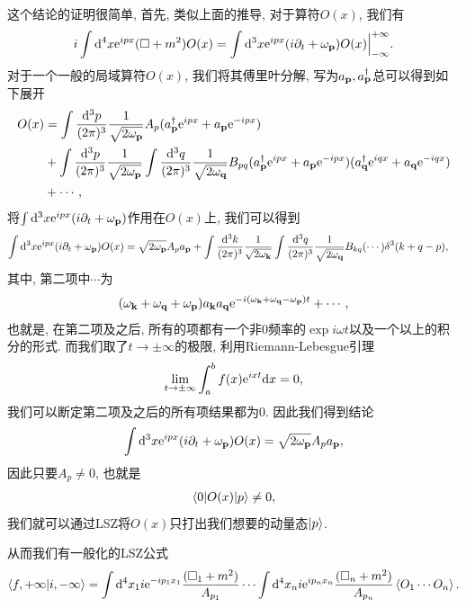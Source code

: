 这个结论的证明很简单, 首先, 类似上面的推导, 对于算符$O(x)$, 我们有
\begin{align}
    i\int\mathrm d^4x\mathrm e^{ipx}(\Box+m^2)O(x)=\int\mathrm d^3x\mathrm e^{ipx}(i\partial_t+\omega_{\mathbf{p}})O(x)\Big|_{-\infty}^{+\infty}.
\end{align}
对于一个一般的局域算符$O(x)$, 我们将其傅里叶分解, 写为$a_{\mathbf{p}}, a_{\mathbf{p}}^\dagger$总可以得到如下展开
\begin{align}
    O(x)&=\int\ldsq pA_p(\a p^\dagger\exp{ipx}+\a p\exp{-ipx})\notag\\
    &+\int\ldsq p\int\ldsq qB_{pq}(\a p^\dagger\exp{ipx}+\a p\exp{-ipx})(\a q^\dagger\exp{iqx}+\a q\exp{-iqx})\notag\\
    &+\cdots,
\end{align}
将$\int\mathrm d^3x\mathrm e^{ipx}(i\partial_t+\omega_{\mathbf{p}})$作用在$O(x)$上, 我们可以得到
\begin{align}
    \int\d^3x\exp{ipx}(i\partial_t+\om p)O(x)&=\sqrt{2\om p}A_p\a p+\int\ldsq k\int\ldsq qB_{kq}(\cdots)\delta^3(k+q-p),
\end{align}
其中, 第二项中$\cdots$为
\begin{align}
    (\omega_{\mathbf{k}}+\omega_{\mathbf{q}}+\omega_{\mathbf{p}})a_{\mathbf{k}}a_{\mathbf{q}}\mathrm e^{-i(\omega_{\mathbf{k}}+\omega_{\mathbf{q}}-\omega_{\mathbf{p}})t}+\cdots,
\end{align}
也就是, 在第二项及之后, 所有的项都有一个非$0$频率的$\exp{i\omega t}$以及一个以上的积分的形式. 而我们取了$t\to\pm\infty$的极限, 利用Riemann-Lebesgue引理
\begin{align}
    \lim_{t\to\pm\infty}\int_a^bf(x)\mathrm e^{ixt}\mathrm d x=0,
\end{align}
我们可以断定第二项及之后的所有项结果都为$0$. 因此我们得到结论
\begin{align}
    \int\mathrm d^3x\mathrm e^{ipx}(i\partial_t+\omega_{\mathbf{p}})O(x)=\sqrt{2\omega_{\mathbf{p}}}A_pa_{\mathbf{p}}, 
\end{align}
因此只要$A_p\neq0$, 也就是
\begin{align}
    \braket{0|O(x)|p}\neq0,
\end{align}
我们就可以通过LSZ将$O(x)$只打出我们想要的动量态$\ket p$. 

从而我们有一般化的LSZ公式
\begin{align}
    \braket{f, +\infty|i, -\infty}=\int\mathrm d^4x_1 i\mathrm e^{-ip_1x_1}\frac{(\Box_1+m^2)}{A_{p_1}}\cdots\int\mathrm d^4x_n i\mathrm e^{ip_nx_n}\frac{(\Box_n+m^2)}{A_{p_n}}\braket{O_1\cdots O_n}.
\end{align}

